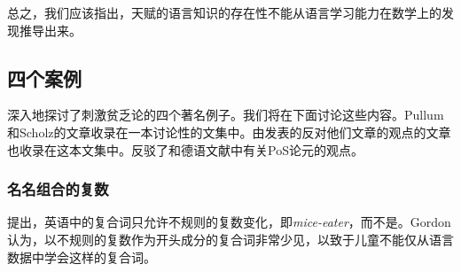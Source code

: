 总之，我们应该指出，天赋的语言知识的存在性不能从语言学习能力在数学上的发现推导出来。 

\subsection{四个案例}
\label{PSA-cases}

\mbox{}\citet{PS2002a}深入地探讨了刺激贫乏论的四个著名例子。我们将在下面讨论这些内容。Pullum和Scholz的文章收录在一本讨论性的文集中。由\citet{SP2002b}发表的反对他们文章的观点的文章也收录在这本文集中。\citet{Eisenberg92b}反驳了\citet{Chomsky86}和德语文献中有关PoS论元的观点。

\subsubsection{名名组合的复数}

\addlines
\mbox{}\citet{Gordon86a}提出，英语中的复合词只允许不规则的复数变化，即\emph{mice-eater}，而不是。Gordon认为，以不规则的复数作为开头成分的复合词非常少见，以致于儿童不能仅从语言数据中学会这样的复合词。

